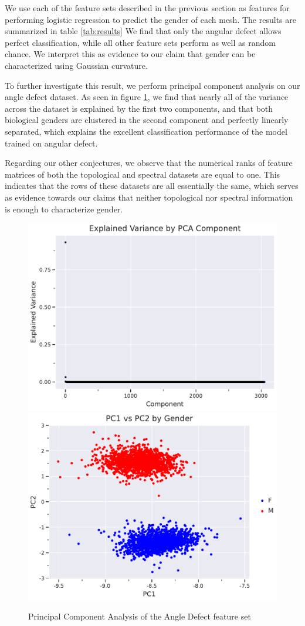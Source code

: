 \documentclass[11pt]{article}
\begin{document}
We use each of the feature sets described in the previous section as features for performing logistic regression to predict the gender of each mesh. The results are summarized in table \ref{tab:results} We find that only the angular defect allows perfect classification, while all other feature sets perform as well as random chance. We interpret this as evidence to our claim that gender can be characterized using Gaussian curvature.

To further investigate this result, we perform principal component analysis on our angle defect dataset. As seen in figure \ref{fig:pca}, we find that nearly all of the variance across the dataset is explained by the first two components, and that both biological genders are clustered in the second component and perfectly linearly separated, which explains the excellent classification performance of the model trained on angular defect.

Regarding our other conjectures, we observe that the numerical ranks of feature matrices of both the topological and spectral datasets are equal to one. This indicates that the rows of these datasets are all essentially the same, which serves as evidence towards our claims that neither topological nor spectral information is enough to characterize gender.

\begin{figure}
    \centering
    \includegraphics[width=.45\textwidth]{../plots/pca_variance.pdf}
    \includegraphics[width=.45\textwidth]{../plots/pca_components.pdf}
    \caption{Principal Component Analysis of the Angle Defect feature set}
    \label{fig:pca}
\end{figure}
\end{document}
